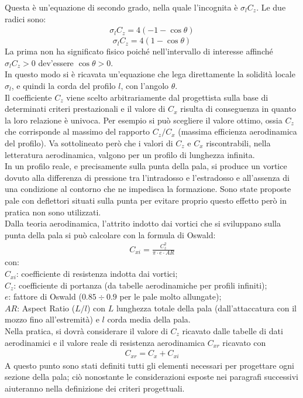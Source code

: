 Questa è un'equazione di secondo grado, nella quale l'incognita è $\sigma_l C_z$. Le due radici sono:
\begin{align*}
\sigma_l C_z = 4 \left(-1 -\cos \theta \right)
\end{align*}
\begin{equation}\label{eq:sigmazc}
\boxed{\sigma_l C_z = 4 \left(1- \cos \theta \right)}
\end{equation}
La prima non ha significato fisico poiché nell'intervallo di interesse affinché $\sigma_l C_z > 0$ dev'essere $\cos \theta > 0 $.\\
In questo modo si è ricavata un'equazione che lega direttamente la solidità locale $\sigma_l$, e quindi la corda del profilo $l$, con l'angolo $\theta$.\\
Il coefficiente $C_z$ viene scelto arbitrariamente dal progettista sulla base di determinati criteri prestazionali e il valore di $C_x$ risulta di conseguenza in quanto la loro relazione è univoca. Per esempio si può scegliere il valore ottimo, ossia $C_z$ che corrisponde al massimo del rapporto $C_z/C_x$ (massima efficienza aerodinamica del profilo). Va sottolineato però che i valori di $C_z$ e $C_x$ riscontrabili, nella letteratura aerodinamica, valgono per un profilo di lunghezza infinita.\\
In un profilo reale, e precisamente sulla punta della pala, si produce un vortice dovuto alla differenza di pressione tra l'intradosso e l'estradosso e all'assenza di una condizione al contorno che ne impedisca la formazione. Sono state proposte pale con deflettori situati sulla punta per evitare proprio questo effetto però in pratica non sono utilizzati.\\
Dalla teoria aerodinamica, l'attrito indotto dai vortici che si sviluppano sulla punta della pala si può calcolare con la formula di Oswald:
\begin{align*}
C_{xi} = \frac{C_z^2}{\pi \cdot e \cdot AR}
\end{align*}
con:\\[1mm]
$C_{xi}$: coefficiente di resistenza indotta dai vortici;\\
$C_z$: coefficiente di portanza (da tabelle aerodinamiche per profili infiniti);\\
$e$: fattore di Oswald ($0.85 \div 0.9$ per le pale molto allungate);\\
$AR$: Aspect Ratio ($L/l$) con $L$ lunghezza totale della pala (dall'attaccatura con il mozzo fino all'estremità) e $l$ corda media della pala.\\[2mm]
Nella pratica, si dovrà considerare il valore di $C_z$ ricavato dalle tabelle di dati aerodinamici e il valore reale di resistenza aerodinamica $C_{xr}$ ricavato con
\begin{align*}
C_{xr} = C_x + C_{xi}
\end{align*}
A questo punto sono stati definiti tutti gli elementi necessari per progettare ogni sezione della pala; ciò nonostante le considerazioni esposte nei paragrafi successivi aiuteranno nella definizione dei criteri progettuali.

